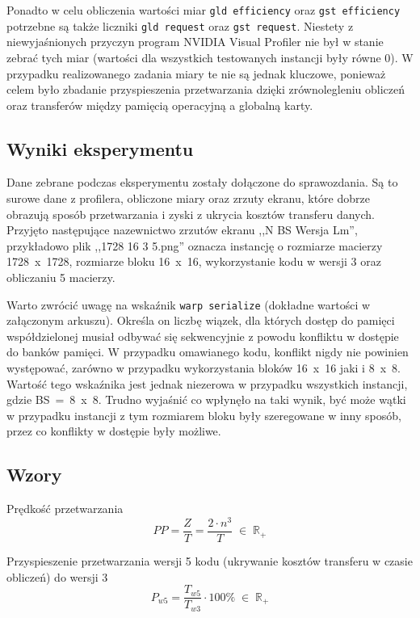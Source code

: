 \documentclass[12pt,a4paper]{article}
\begin{document}
Ponadto w celu obliczenia wartości miar \verb|gld efficiency| oraz \verb|gst efficiency| potrzebne są także liczniki  \verb|gld request| oraz  \verb|gst request|. Niestety z niewyjaśnionych przyczyn program NVIDIA Visual Profiler nie był w stanie zebrać tych  miar (wartości dla wszystkich testowanych instancji były równe 0). W przypadku realizowanego zadania miary te nie są jednak kluczowe, ponieważ celem było zbadanie przyspieszenia przetwarzania dzięki zrównolegleniu obliczeń oraz transferów między pamięcią operacyjną a globalną karty.


\subsection{Wyniki eksperymentu}

Dane zebrane podczas eksperymentu zostały dołączone do sprawozdania. Są to surowe dane z profilera, obliczone miary oraz zrzuty ekranu, które dobrze obrazują sposób przetwarzania i zyski z ukrycia kosztów transferu danych. Przyjęto następujące nazewnictwo zrzutów ekranu ,,N BS Wersja Lm'', przykładowo plik ,,1728 16 3 5.png'' oznacza instancję o rozmiarze macierzy 1728~x~1728, rozmiarze bloku 16~x~16, wykorzystanie kodu w wersji 3 oraz obliczaniu 5 macierzy.

Warto zwrócić uwagę na wskaźnik \verb|warp serialize| (dokładne wartości w załączonym arkuszu). Określa on liczbę wiązek, dla których dostęp do pamięci współdzielonej musiał odbywać się sekwencyjnie z powodu konfliktu w dostępie do banków pamięci. W przypadku omawianego kodu, konflikt nigdy nie powinien występować, zarówno w przypadku wykorzystania bloków 16~x~16 jaki i 8~x~8. Wartość tego wskaźnika jest jednak niezerowa w przypadku wszystkich instancji, gdzie BS~=~8~x~8. Trudno wyjaśnić co wpłynęło na taki wynik, być może wątki w przypadku instancji z tym rozmiarem bloku były szeregowane w inny sposób, przez co konflikty w dostępie były możliwe.

\subsection{Wzory}

Prędkość przetwarzania
\begin{equation}
PP = \frac{Z}{T} = \frac{2 \cdot n^3}{T} \; \in \; \mathbb{R}_+
\end{equation}

\vspace{0.5cm}

Przyspieszenie przetwarzania wersji 5 kodu (ukrywanie kosztów transferu w czasie obliczeń) do wersji 3
\begin{equation}
P_{w5} = \frac{T_{w5}}{T_{w3}} \cdot 100\% \; \in \; \mathbb{R}_+
\end{equation}
\end{document}
